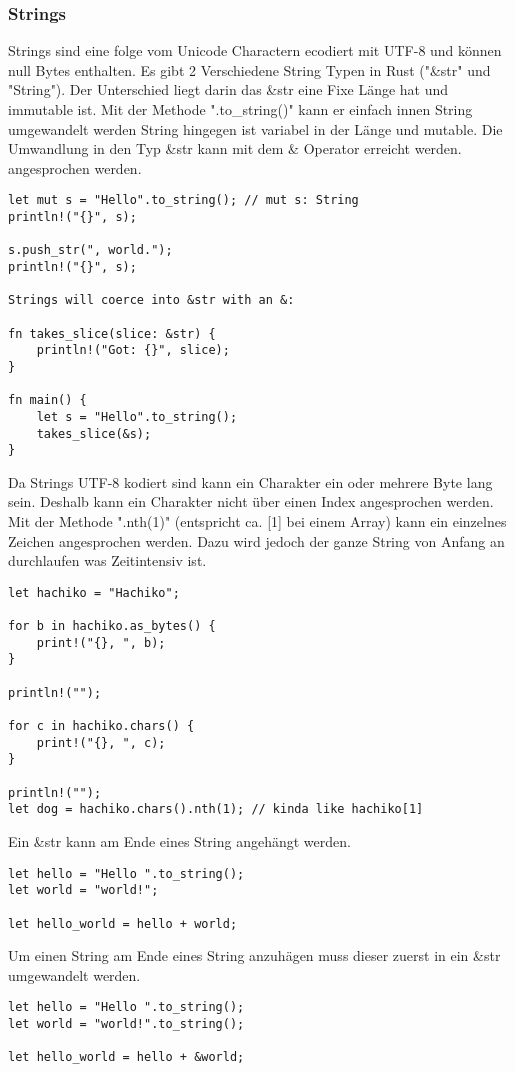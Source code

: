 \subsubsection{Strings}
Strings sind eine folge vom Unicode Charactern ecodiert mit UTF-8 und können null Bytes enthalten. Es gibt 2 Verschiedene String Typen in Rust ("\&str" und "String"). Der Unterschied liegt darin das \&str eine Fixe Länge hat und immutable ist. Mit der Methode ".to\_string()" kann er einfach innen String umgewandelt werden String hingegen ist variabel in der Länge und mutable. Die Umwandlung in den Typ \&str kann mit dem \& Operator erreicht werden.  angesprochen werden.

\begin{lstlisting}
let mut s = "Hello".to_string(); // mut s: String
println!("{}", s);

s.push_str(", world.");
println!("{}", s);

Strings will coerce into &str with an &:

fn takes_slice(slice: &str) {
	println!("Got: {}", slice);
}

fn main() {
	let s = "Hello".to_string();
	takes_slice(&s);
}
\end{lstlisting}


Da Strings UTF-8 kodiert sind kann ein Charakter ein oder mehrere Byte lang sein. Deshalb kann ein Charakter nicht über einen Index angesprochen werden. Mit der Methode ".nth(1)" (entspricht ca. [1] bei einem Array) kann ein einzelnes Zeichen angesprochen werden. Dazu wird jedoch der ganze String von Anfang an durchlaufen was Zeitintensiv ist.

\begin{lstlisting}
let hachiko = "Hachiko";

for b in hachiko.as_bytes() {
	print!("{}, ", b);
}

println!("");

for c in hachiko.chars() {
	print!("{}, ", c);
}

println!("");
let dog = hachiko.chars().nth(1); // kinda like hachiko[1]
\end{lstlisting}


Ein \&str kann am Ende eines String angehängt werden.

\begin{lstlisting}
let hello = "Hello ".to_string();
let world = "world!";

let hello_world = hello + world;
\end{lstlisting}

Um einen String am Ende eines String anzuhägen muss dieser zuerst in ein \&str umgewandelt werden.

\begin{lstlisting}
let hello = "Hello ".to_string();
let world = "world!".to_string();

let hello_world = hello + &world;
\end{lstlisting}
